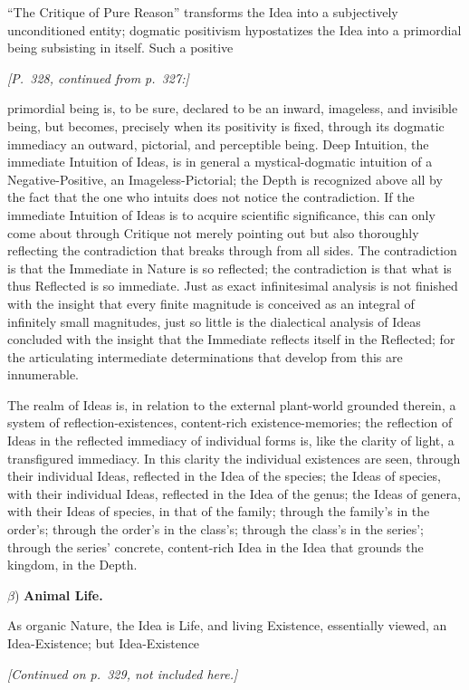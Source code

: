 \documentclass[12pt,a4paper]{article}
\begin{document}
\noindent ``The Critique of Pure Reason'' transforms the Idea
into a subjectively unconditioned entity; dogmatic positivism
hypostatizes the Idea into a primordial being subsisting in
itself. Such a positive

\medskip
\noindent\textit{[P.\ 328, continued from p.\ 327:]}

\medskip

\noindent primordial being is, to be sure, declared to be an
inward, imageless, and invisible being, but becomes, precisely
when its positivity is fixed, through its dogmatic immediacy an
outward, pictorial, and perceptible being. Deep Intuition, the
immediate Intuition of Ideas, is in general a mystical-dogmatic
intuition of a Negative-Positive, an Imageless-Pictorial; the
Depth is recognized above all by the fact that the one who
intuits does not notice the contradiction. If the immediate
Intuition of Ideas is to acquire scientific significance, this
can only come about through Critique not merely pointing out but
also thoroughly reflecting the contradiction that breaks through
from all sides. The contradiction is that the Immediate in
Nature is so reflected; the contradiction is that what is thus
Reflected is so immediate. Just as exact infinitesimal analysis
is not finished with the insight that every finite magnitude is
conceived as an integral of infinitely small magnitudes, just so
little is the dialectical analysis of Ideas concluded with the
insight that the Immediate reflects itself in the Reflected; for
the articulating intermediate determinations that develop from
this are innumerable.

The realm of Ideas is, in relation to the external plant-world
grounded therein, a system of reflection-existences, content-rich
existence-memories; the reflection of Ideas in the reflected
immediacy of individual forms is, like the clarity of light, a
transfigured immediacy. In this clarity the individual existences
are seen, through their individual Ideas, reflected in the Idea
of the species; the Ideas of species, with their individual
Ideas, reflected in the Idea of the genus; the Ideas of genera,
with their Ideas of species, in that of the family; through the
family's in the order's; through the order's in the class's;
through the class's in the series'; through the series' concrete,
content-rich Idea in the Idea that grounds the kingdom, in the
Depth.

\medskip
\noindent $\beta$) \textbf{Animal Life.}

As organic Nature, the Idea is Life, and living Existence,
essentially viewed, an Idea-Existence; but Idea-Existence

\medskip
\noindent\textit{[Continued on p.\ 329, not included here.]}
\end{document}
